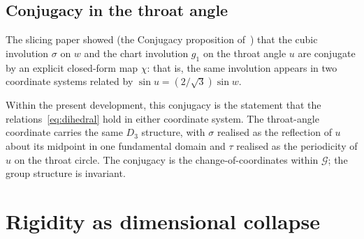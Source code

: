 \documentclass[11pt,a4paper]{article}
\theoremstyle{definition}
\begin{document}
\subsection{Conjugacy in the throat angle}\label{sec:conjugacy}

The slicing paper showed (the Conjugacy proposition of~\cite{JanzenSlicing}) that the cubic involution $\sigma$ on $w$ and the chart involution $g_{1}$ on the throat angle $u$ are conjugate by an explicit closed-form map $\chi$: that is, the same involution appears in two coordinate systems related by $\sin u = (2/\sqrt{3})\sin w$.

Within the present development, this conjugacy is the statement that the relations~\eqref{eq:dihedral} hold in either coordinate system. The throat-angle coordinate carries the same $D_{3}$ structure, with $\sigma$ realised as the reflection of $u$ about its midpoint in one fundamental domain and $\tau$ realised as the periodicity of $u$ on the throat circle. The conjugacy is the change-of-coordinates within $\mathcal{G}$; the group structure is invariant.

\section{Rigidity as dimensional collapse}\label{sec:rigidity}
\end{document}

